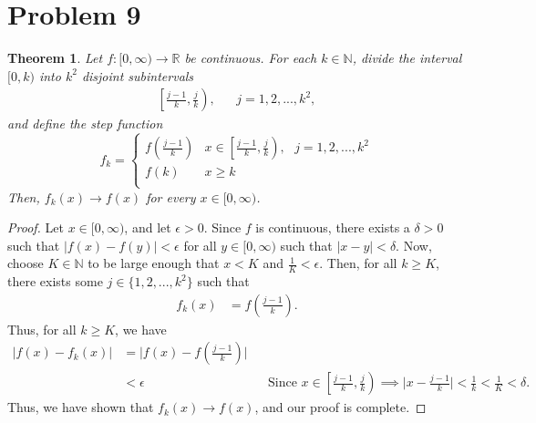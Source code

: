 \documentclass[10pt,a4paper]{article}
\theoremstyle{theorem}
\newtheorem{theorem}{Theorem}
\theoremstyle{definition}
\begin{document}
\section*{Problem 9}
\begin{theorem}
Let $f: [0, \infty) \to \mathbb{R}$ be continuous. For each $k \in \mathbb{N}$, divide the interval $[0, k)$ into $k^2$ disjoint subintervals
\begin{align*}
\left[ \frac{j - 1}{k}, \frac{j}{k} \right), && j=1,2,...,k^2,
\end{align*}
and define the step function 
\[   f_k = \left\{
\begin{array}{ll}
      f\left( \frac{j - 1}{k} \right) & x \in \left[ \frac{j - 1}{k}, \frac{j}{k} \right),  \text{  } j=1,2,...,k^2\\
      f(k) & x \geq k \\
\end{array} 
\right. \]
Then, $f_k(x) \to f(x)$ for every $x \in [0, \infty)$.
\end{theorem}

\begin{proof}
Let $x \in [0, \infty)$, and let $\epsilon > 0$. Since $f$ is continuous, there exists a $\delta > 0$ such that $|f(x) - f(y)| < \epsilon$ for all $y \in [0, \infty)$ such that $|x - y| < \delta$. Now, choose $K \in \mathbb{N}$ to be large enough that $x < K$ and $\frac{1}{K} < \epsilon$. Then, for all $k \geq K$, there exists some $j \in \{1, 2, ..., k^2 \}$ such that 
\begin{align*}
f_k(x) &= f\left( \frac{j - 1}{k} \right).
\end{align*}
Thus, for all $k \geq K$, we have
\begin{align*}
|f(x) - f_k(x)| &= \biggl| f(x) -  f\left( \frac{j - 1}{k} \right) \biggr|\\
&< \epsilon && \text{Since } x \in \left[ \frac{j - 1}{k}, \frac{j}{k} \right) \implies \biggl|x - \frac{j - 1}{k} \biggr| < \frac{1}{k} < \frac{1}{K}  <\delta.
\end{align*}
Thus, we have shown that $f_k(x) \to f(x)$, and our proof is complete.
\end{proof}
\end{document}
